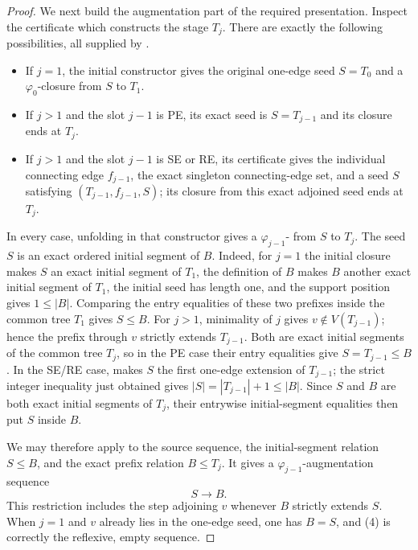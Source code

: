 \begin{proof}
We next build the augmentation part of the required presentation.  Inspect
the certificate which constructs the stage $T_j$.  There are exactly the
following possibilities, all supplied by
.
\begin{itemize}
\item If $j=1$, the initial constructor gives the original one-edge seed
      $S=T_0$ and a $\varphi_0$-closure from $S$ to $T_1$.
\item If $j>1$ and the slot $j-1$ is PE, its exact seed is
      $S=T_{j-1}$ and its closure ends at $T_j$.
\item If $j>1$ and the slot $j-1$ is SE or RE, its certificate gives the
      individual connecting edge $f_{j-1}$, the exact singleton
      connecting-edge set, and a seed $S$ satisfying
      $(T_{j-1},f_{j-1},S)$; its closure
      from this exact adjoined seed ends at $T_j$.
\end{itemize}
In every case, unfolding  in that constructor
gives a
$\varphi_{j-1}$- from $S$ to
$T_j$.  The seed $S$ is an exact ordered initial segment of $B$.  Indeed,
for $j=1$ the initial closure makes $S$ an exact initial segment of
$T_1$, the definition of $B$ makes $B$ another exact initial segment of
$T_1$, the initial seed has length one, and the support position gives
$1\leq |B|$.  Comparing the entry equalities of these two prefixes inside
the common tree $T_1$ gives $S\leq B$.  For $j>1$, minimality of $j$ gives
$v\notin V(T_{j-1})$; hence the prefix through $v$ strictly extends
$T_{j-1}$.  Both are exact initial segments of the common tree $T_j$, so
in the PE case their entry equalities give $S=T_{j-1}\leq B$.  In the
SE/RE case,  makes $S$ the first one-edge
extension of $T_{j-1}$; the strict integer inequality just obtained gives
$|S|=|T_{j-1}|+1\leq |B|$.  Since $S$ and $B$ are both exact initial
segments of $T_j$, their entrywise initial-segment equalities then put
$S$ inside $B$.

We may therefore apply
 to the source sequence,
the initial-segment relation $S\leq B$, and the exact prefix relation
$B\leq T_j$.  It gives a $\varphi_{j-1}$-augmentation sequence
\[
                         S\longrightarrow B.                 \tag{4}
\]
This restriction includes the step adjoining $v$ whenever $B$ strictly
extends $S$.  When $j=1$ and $v$ already lies in the one-edge seed, one
has $B=S$, and (4) is correctly the reflexive, empty sequence.


\end{proof}
